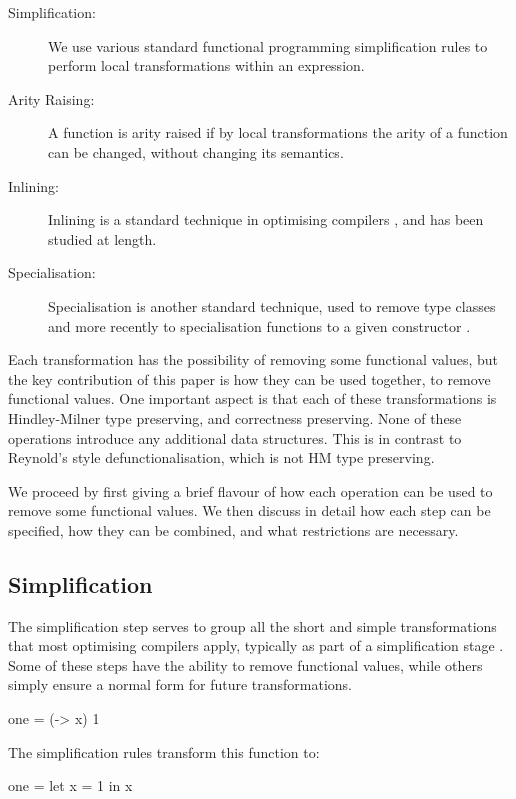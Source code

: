 \documentclass[preprint]{sigplanconf}
\begin{document}
\begin{description}
\item[Simplification:] We use various standard functional programming simplification rules to perform local transformations within an expression. \cite{Compilation by Transformation in the Glasgow Haskell Compiler}
\item[Arity Raising:] A function is arity raised \cite{arity_raising} if by local transformations the arity of a function can be changed, without changing its semantics.
\item[Inlining:] Inlining is a standard technique in optimising compilers \cite{spj:inline}, and has been studied at length.
\item[Specialisation:] Specialisation is another standard technique, used to remove type classes \cite{hudak:removing_type_classes} and more recently to specialisation functions to a given constructor \cite{spj:specconstr}.
\end{description}

Each transformation has the possibility of removing some functional values, but the key contribution of this paper is how they can be used together, to remove functional values. One important aspect is that each of these transformations is Hindley-Milner type preserving, and correctness preserving. None of these operations introduce any additional data structures. This is in contrast to Reynold's style defunctionalisation, which is not HM type preserving.

We proceed by first giving a brief flavour of how each operation can be used to remove some functional values. We then discuss in detail how each step can be specified, how they can be combined, and what restrictions are necessary.

\subsection{Simplification}

The simplification step serves to group all the short and simple transformations that most optimising compilers apply, typically as part of a simplification stage \cite{ghc_simplifier}. Some of these steps have the ability to remove functional values, while others simply ensure a normal form for future transformations.

\begin{example}
\begin{code}
one = (\x -> x) 1
\end{code}

The simplification rules transform this function to:

\begin{code}
one = let x = 1 in x
\end{code}
\end{example}
\end{document}
